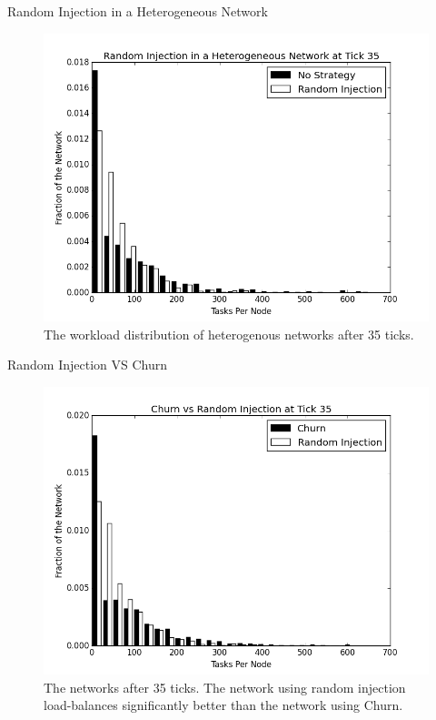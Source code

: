 \documentclass[11pt]{beamer}
\begin{document}
\begin{frame}{Random Injection in a Heterogeneous Network}
\begin{figure}
	\centering
	\includegraphics[width=0.7\linewidth]{figs/randomStableHistHetero35}
	\caption[Random injection in a Heterogenous Network]{The workload distribution of heterogenous networks after 35 ticks.  }
	\label{fig:randomStableHistHetero35}
\end{figure}
\end{frame}



\begin{frame}{Random Injection VS Churn}
\begin{figure}
	\centering
	\includegraphics[width=0.7\linewidth]{figs/churnInjectionHist35}
	\caption[Churn vs Random Injection after 35 ticks.]{The networks after 35 ticks.  The network using random injection load-balances significantly better than the network using Churn.}
	\label{fig:churnInjectionHist35}
\end{figure}

\end{frame}
\end{document}
